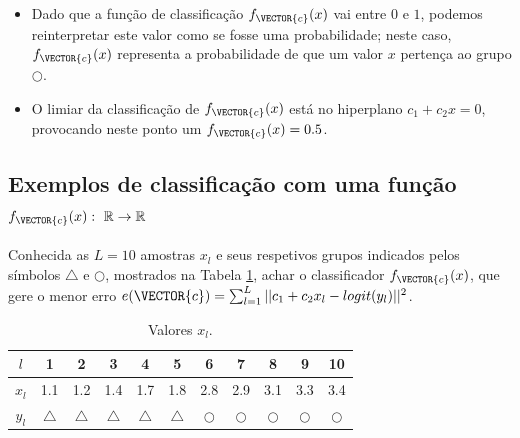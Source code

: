 \begin{tcbattention}
\begin{itemize}
\item Dado que a função de classificação $f_{\VECTOR{c}}(x)$ vai entre $0$ e $1$,
podemos reinterpretar este valor como se fosse uma probabilidade;
neste caso, $f_{\VECTOR{c}}(x)$ representa a probabilidade de que um valor $x$
pertença ao grupo $\bigcirc$.
\item O limiar da classificação de $f_{\VECTOR{c}}(x)$ está no hiperplano $c_1  +c_2x=0$,
provocando neste ponto um $f_{\VECTOR{c}}(x)=0.5$.
\end{itemize}
\end{tcbattention}



\subsection{Exemplos de classificação com uma função
$f_{\VECTOR{c}}(x):~\mathbb{R} \rightarrow \mathbb{R}$ }

\begin{example}\label{ex:theo:reglogr1r1}
Conhecida as $L=10$ amostras $x_l$ e seus respetivos grupos indicados pelos símbolos $\bigtriangleup$ e $\bigcirc$, 
mostrados na Tabela \ref{table:theo:reglogr1r1:xn},
achar o classificador $f_{\VECTOR{c}}(x)$, 
que gere o menor erro $e(\VECTOR{c}) =  \sum_{l=1}^{L} ||c_1 +c_2 x_l -logit(y_l)||^2$.
\end{example}


\begin{table}[h!]
\centering
\begin{tabular}{|c||c|c|c|c|c||c|c|c|c|c|} 
 \hline
$l$   & 1 & 2 & 3 & 4 & 5 & 6 & 7 & 8 & 9 & 10 \\ \hline \hline
$x_l$ & 1.1 & 1.2 & 1.4 & 1.7 & 1.8 & 2.8 & 2.9 & 3.1 & 3.3 & 3.4  \\ \hline
$y_l$ & $\bigtriangleup$ & $\bigtriangleup$ & $\bigtriangleup$ & $\bigtriangleup$ & $\bigtriangleup$
      & $\bigcirc$ & $\bigcirc$ & $\bigcirc$ & $\bigcirc$ & $\bigcirc$ \\ \hline
\end{tabular}
\caption{Valores $x_l$.}
\label{table:theo:reglogr1r1:xn}
\end{table}


